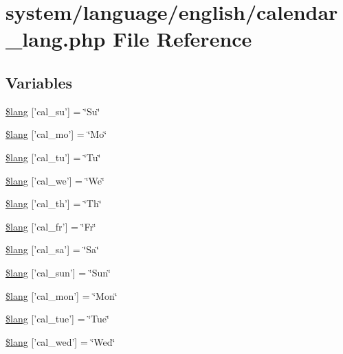 \hypertarget{calendar__lang_8php}{\section{system/language/english/calendar\-\_\-lang.php File Reference}
\label{calendar__lang_8php}
}
\subsection*{Variables}
\begin{DoxyCompactItemize}
\item 
\hyperlink{calendar__lang_8php_a120ec4cf98cb46665da894790bf9d68b}{\$lang} \mbox{[}'cal\-\_\-su'\mbox{]} = \char`\"{}Su\char`\"{}
\item 
\hyperlink{calendar__lang_8php_addb07b314f8ffca137dd372ffccc0086}{\$lang} \mbox{[}'cal\-\_\-mo'\mbox{]} = \char`\"{}Mo\char`\"{}
\item 
\hyperlink{calendar__lang_8php_ae6d1a5da4eaa6f0ea7b90c1f1f8c5d58}{\$lang} \mbox{[}'cal\-\_\-tu'\mbox{]} = \char`\"{}Tu\char`\"{}
\item 
\hyperlink{calendar__lang_8php_acfa4ce5b6c72a960be91a2ebd7049e51}{\$lang} \mbox{[}'cal\-\_\-we'\mbox{]} = \char`\"{}We\char`\"{}
\item 
\hyperlink{calendar__lang_8php_af5b11785dc4aa3ef3df6a3fe1d3158c4}{\$lang} \mbox{[}'cal\-\_\-th'\mbox{]} = \char`\"{}Th\char`\"{}
\item 
\hyperlink{calendar__lang_8php_a7edbb0ca2d2bf43cf32e8b946d87831d}{\$lang} \mbox{[}'cal\-\_\-fr'\mbox{]} = \char`\"{}Fr\char`\"{}
\item 
\hyperlink{calendar__lang_8php_a16c4faf67e8c4d3aff3fbd1cd831a0d1}{\$lang} \mbox{[}'cal\-\_\-sa'\mbox{]} = \char`\"{}Sa\char`\"{}
\item 
\hyperlink{calendar__lang_8php_a6a2329330c22e5e6058f53061fae0b62}{\$lang} \mbox{[}'cal\-\_\-sun'\mbox{]} = \char`\"{}Sun\char`\"{}
\item 
\hyperlink{calendar__lang_8php_a3e1c2966ff8ebb4b528d9a6e60a7a11c}{\$lang} \mbox{[}'cal\-\_\-mon'\mbox{]} = \char`\"{}Mon\char`\"{}
\item 
\hyperlink{calendar__lang_8php_ad6b1b4ce855d9ed3f88dc4e7e71f5248}{\$lang} \mbox{[}'cal\-\_\-tue'\mbox{]} = \char`\"{}Tue\char`\"{}
\item 
\hyperlink{calendar__lang_8php_a94d7b85acb850c5930399c9099b22412}{\$lang} \mbox{[}'cal\-\_\-wed'\mbox{]} = \char`\"{}Wed\char`\"{}
\item 

\end{DoxyCompactItemize}
